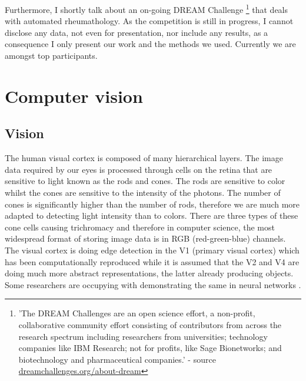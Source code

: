 \documentclass[a4paper,12pt]{article}
\begin{document}
\par Furthermore, I shortly talk about an on-going DREAM Challenge \footnote{'The DREAM Challenges are an open science effort, a non-profit, collaborative community effort consisting of contributors from across the research spectrum including researchers from universities; technology companies like IBM Research; not for profits, like Sage Bionetworks; and biotechnology and pharmaceutical companies.' - source \url{dreamchallenges.org/about-dream}} that deals with automated rheumathology. As the competition is still in progress, I cannot disclose any data, not even for presentation, nor include any results, as a consequence I only present our work and the methods we used. Currently we are amongst top participants.

\newpage

\section{Computer vision}

\vspace{7mm}

\subsection{Vision}

\vspace{7mm}

\par The human visual cortex is composed of many hierarchical layers. The image data required by our eyes is processed through cells on the retina that are sensitive to light known as the rods and cones. The rods are sensitive to color whilst the cones are sensitive to the intensity of the photons. The number of cones is significantly higher than the number of rods, therefore we are much more adapted to detecting light intensity than to colors. There are three types of these cone cells causing trichromacy \cite{arrese2002trichromacy} and therefore in computer science, the most widespread format of storing image data is in RGB (red-green-blue) channels. The visual cortex is doing edge detection in the V1 (primary visual cortex) which has been computationally reproduced \cite{olshausen1996emergence} while it is assumed that the V2 \cite{ZiembaV2} and V4 are doing much more abstract representations, the latter already producing objects. Some researchers are occupying with demonstrating the same in neural networks \cite{cammarata2020thread:}.
\end{document}
